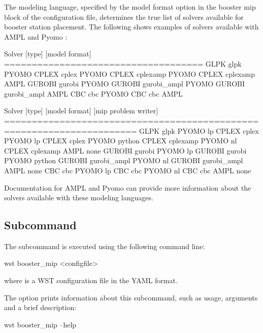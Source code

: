 The modeling language, specified by the model format option in the
booster mip block of the configuration file, determines the true 
list of solvers available for booster station placement. The following shows examples of 
solvers available with AMPL \citep{AMPL} and Pyomo \citep{PYOMO}:
\begin{unknownListing}
Solver   [type]      [model format] 
====================================
GLPK     glpk          PYOMO       
CPLEX    cplex         PYOMO          
CPLEX    cplexamp      PYOMO        
CPLEX    cplexamp      AMPL         
GUROBI   gurobi        PYOMO             
GUROBI   gurobi_ampl   PYOMO          
GUROBI   gurobi_ampl   AMPL      
CBC      cbc           PYOMO             
CBC      cbc           AMPL            
\end{unknownListing}
\begin{unknownListing}
Solver   [type]      [model format]   [mip problem writer]
======================================================================
GLPK     glpk          PYOMO              lp
CPLEX    cplex         PYOMO              lp
CPLEX    cplex         PYOMO              python
CPLEX    cplexamp      PYOMO              nl
CPLEX    cplexamp      AMPL               none
GUROBI   gurobi        PYOMO              lp
GUROBI   gurobi        PYOMO              python
GUROBI   gurobi_ampl   PYOMO              nl
GUROBI   gurobi_ampl   AMPL               none
CBC      cbc           PYOMO              lp
CBC      cbc           PYOMO              nl
CBC      cbc           AMPL               none       
\end{unknownListing}
\fi
Documentation for AMPL \citep{AMPL} and Pyomo \citep{PYOMO} can provide more information 
about the solvers available with these modeling languages. 

\subsection{ Subcommand} 

The  subcommand is executed using the following command line:
\begin{unknownListing}
wst booster_mip <configfile> 
\end{unknownListing}
where  is a WST configuration file in the YAML format. 

The  option prints information about this subcommand, such as usage,
arguments and a brief description:
\begin{unknownListing}
wst booster_mip --help
\end{unknownListing}

